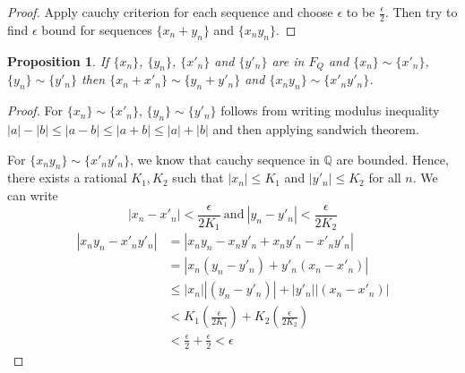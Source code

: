 \documentclass[12pt]{report}
\newtheorem{prop}{Proposition}
\begin{document}
\begin{proof}
    Apply cauchy criterion for each sequence and choose $\epsilon$ to be $\frac{\epsilon}{2}$. Then try to find $\epsilon$ bound for sequences $\{x_n + y_n\}$ and $\{x_ny_n\}$.
\end{proof}
\begin{prop}
    If $\{x_n\}$, $\{y_n\}$, $\{x'_n\}$ and $\{y'_n\}$ are in $F_Q$ and $\{x_n\}\sim \{x'_n\}$, $\{y_n\}\sim \{y'_n\}$ then $\{x_n + x'_n\}\sim \{y_n + y'_n\}$ and $\{x_ny_n\} \sim \{x'_ny'_n\}$.
\end{prop}
\begin{proof}
    For $\{x_n\}\sim \{x'_n\}$, $\{y_n\}\sim \{y'_n\}$ follows from writing modulus inequality $|a| - |b| \leq |a-b| \leq |a+b| \leq |a| + |b|$ and then applying sandwich theorem.

    For $\{x_ny_n\} \sim \{x'_ny'_n\}$, we know that cauchy sequence in $\mathbb{Q}$ are bounded. Hence, there exists a rational $K_1,K_2$ such that $|x_n| \leq K_1$ and $|y'_n| \leq K_2$ for all $n$. We can write 
    $$ |x_n - x'_n| < \frac{\epsilon}{2K_1}~\text{and}~|y_n - y'_n| < \frac{\epsilon}{2K_2}$$
    \begin{align*}
        |x_ny_n - x'_ny'_n| &= |x_ny_n - x_ny'_n + x_ny'_n - x'_ny'_n|\\
        &= |x_n(y_n - y'_n) + y'_n(x_n - x'_n)|\\
        &\leq |x_n||(y_n - y'_n) | + |y'_n||(x_n - x'_n)|\\
        &< K_1\left(\frac{\epsilon}{2K_1}\right) + K_2\left(\frac{\epsilon}{2K_2}\right)\\
        &< \frac{\epsilon}{2} + \frac{\epsilon}{2} < \epsilon
    \end{align*}
\end{proof}
\end{document}
